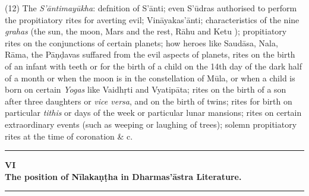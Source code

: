 \documentclass[11pt, openany]{book}
\begin{document}
(12) The \emph{\en S'āntimayūkha}: defnition of S'ānti; even S'ūdras authorised to perform the propitiatory rites for averting evil; Vināyakas'ānti; characteristics of the nine \emph{\en grahas} (the sun, the moon, Mars and the rest, Rāhu and Ketu ); propitiatory rites on the conjunctions of certain planets; how heroes like Saudāsa, Nala, Rāma, the Pāṇḍavas suffared from the evil aspects of planets, rites on the birth of an infant with teeth or for the birth of a child on the 14th day of the dark half of a month or when the moon is in the constellation of Mūla, or when a child is born on certain \emph{\en Yogas} like Vaidhṛti and Vyatipāta; rites on the birth of a son after three daughters or \emph{\en vice versa}, and on the birth of twins; rites for birth on particular \emph{\en tithis} or days of the week or particular lunar mansions; rites on certain extraordinary events (such as weeping or laughing of trees); solemn propitiatory rites at the time of coronation \& c.

\begin{center}
\rule{0.2\linewidth}{0.5pt}
\end{center}

\fancyhead[RE,LO]{\thepage}
\cfoot{}
\newpage
\renewcommand{\thepage}{\Roman{page}}
\setcounter{page}{35}


\begin{center}
\textbf{\large VI}\\

\vspace{1mm}
\textbf{\large The position of Nīlakaṇṭha in Dharmas'āstra Literature.}\\

\rule{0.2\linewidth}{0.5pt}
\end{center}
\end{document}
